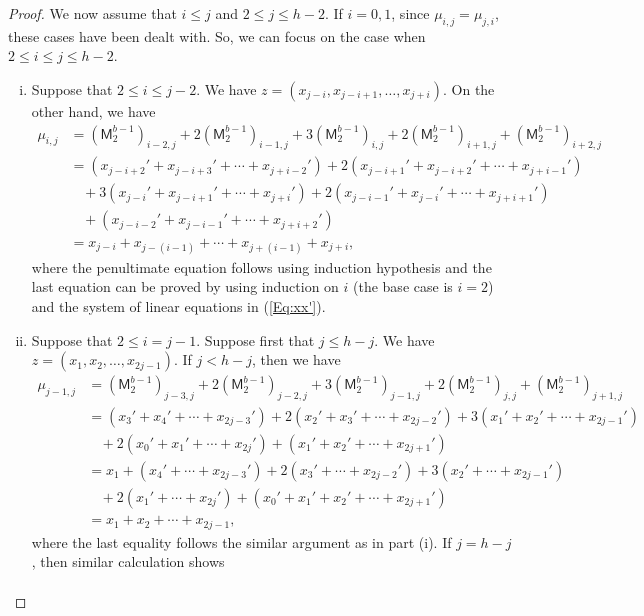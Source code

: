 \documentclass[12pt,reqno]{amsart}
\renewcommand{\leq}{\leqslant}
\newcommand{\M}{\mathsf{M}}
\theoremstyle{definition}
\numberwithin{equation}{section}
\begin{document}
\begin{proof}
    We now assume that $i\leq j$ and $2\leq j\leq h-2$. If $i=0,1$, since $\mu_{i,j}=\mu_{j,i}$, these cases have been dealt with. So, we can focus on the case when $2\leq i\leq j\leq h-2$. 
    \begin{enumerate}[(i)]
	  \item Suppose that $2\leq i\leq j-2$. We have 
        $z=(x_{j-i},x_{j-i+1},\ldots,x_{j+i})$. On the other hand, we have 
        \begin{align*} 
        \mu_{i,j}&=(\M_2^{b-1})_{i-2,j}+2(\M_2^{b-1})_{i-1,j}+ 3(\M_2^{b-1})_{i,j}+ 2(\M_2^{b-1})_{i+1,j}+ (\M_2^{b-1})_{i+2,j}\\
        &=(x_{j-i+2}'+x_{j-i+3}'+\cdots+x_{j+i-2}')+2(x_{j-i+1}'+ x_{j-i+2}'+\cdots+x_{j+i-1}')\\
        &\ \ \ \ +3(x_{j-i}'+x_{j-i+1}'+\cdots+x_{j+i}')+2(x_{j-i-1}'+ x_{j-i}'+\cdots+x_{j+i+1}')\\
        &\ \ \ \ +(x_{j-i-2}'+x_{j-i-1}'+\cdots+x_{j+i+2}')\\
        &=x_{j-i}+x_{j-(i-1)}+\cdots+x_{j+(i-1)}+x_{j+i},
        \end{align*} 
        where the penultimate equation follows using induction hypothesis and the last equation can be proved by using induction on $i$ (the base case is $i=2$) and the system of linear equations in (\ref{Eq:xx'}). 
      \item Suppose that $2\leq i=j-1$. Suppose first that $j\leq h-j$. We have $z=(x_1,x_2,\ldots,x_{2j-1})$. If $j<h-j$, then we have 
          \begin{align*}
            \mu_{j-1,j}&=(\M_2^{b-1})_{j-3,j}+ 2(\M_2^{b-1})_{j-2,j}+ 3(\M_2^{b-1})_{j-1,j}+ 2(\M_2^{b-1})_{j,j}+(\M_2^{b-1})_{j+1,j}\\
            &=(x_3'+x_4'+\cdots+x_{2j-3}')+ 2(x_2'+x_3'+\cdots+x_{2j-2}')+ 3(x_1'+x_2'+\cdots+x_{2j-1}')\\&\ \ \ \  
            + 2(x_0'+x_1'+\cdots+x_{2j}') + (x_1'+x_2'+\cdots+x_{2j+1}')\\
            &=x_1+(x_4'+\cdots+x_{2j-3}')+ 2(x_3'+\cdots+x_{2j-2}')+ 3(x_2'+\cdots+x_{2j-1}')\\&\ \ \ \ 
            + 2(x_1'+\cdots+x_{2j}') + (x_0'+x_1'+x_2'+\cdots+x_{2j+1}')\\
            &=x_1+x_2+\cdots+x_{2j-1},
          \end{align*} where the last equality follows the similar argument as in part (i). If $j=h-j$, then similar calculation shows
          \begin{align*}

\end{align*}
\end{enumerate}
\end{proof}
\end{document}
